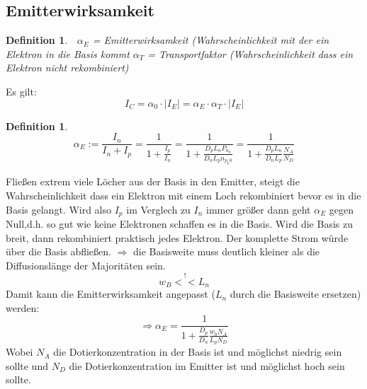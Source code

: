 \documentclass[12pt,a4paper]{report}%
\newtheorem{definition}[satz]{Definition}
\numberwithin{equation}{section}
\numberwithin{equation}{subsection}
\begin{document}
  \subsection{Emitterwirksamkeit}
  \begin{definition}$\;$\newline
    $\alpha_E$ = Emitterwirksamkeit (Wahrscheinlichkeit mit der ein Elektron in die Basis kommt \newline
    $\alpha_T$ = Transportfaktor (Wahrscheinlichkeit dass ein Elektron nicht rekombiniert)
  \end{definition}
  Es gilt: 
  \begin{equation}
    I_C = \alpha_0 \cdot |I_E| = \alpha_E \cdot \alpha_T \cdot |I_E|
  \end{equation}
  \begin{definition}
    \begin{equation}
      \alpha_E := \frac{I_n}{I_n + I_p} = \frac{1}{1+\frac{I_p}{I_n}} = \frac{1}{1+\frac{D_p L_n P_{n_0}}{D_n L_p n_{p_p0}}} = \frac{1}{1+\frac{D_p L_n}{D_n L_p}\frac{N_A}{N_D}}
    \end{equation}
  \end{definition}
    Fließen extrem viele Löcher aus der Basis in den Emitter, steigt die Wahrscheinlichkeit dass ein Elektron mit einem Loch rekombiniert bevor es in die Basis gelangt. Wird also $I_p$ im Verglech zu $I_n$ immer größer dann geht $\alpha_E$ gegen Null,d.h. so gut wie keine Elektronen schaffen es in die Basis.\newline
   Wird die Basis zu breit, dann rekombiniert praktisch jedes Elektron. Der komplette Strom würde über die Basis abfließen.\newline 
   $\Rightarrow$ die Basisweite muss deutlich kleiner als die Diffusionslänge der Majoritäten sein.
   \begin{equation}
     w_B \overset{!}{<<} L_n
   \end{equation}
   Damit kann die Emitterwirksamkeit angepasst ($L_n$ durch die Basisweite ersetzen) werden:
   \begin{equation}
     \Rightarrow \alpha_E = \frac{1}{1 + \frac{D_p}{D_n} \displaystyle\frac{w_b N_A}{L_p N_D}}
   \end{equation}
   Wobei $N_A$ die Dotierkonzentration in der Basis ist und möglichst niedrig sein sollte und $N_D$ die Dotierkonzentration im Emitter ist und möglichst hoch sein sollte. \newline
   
\end{document}
